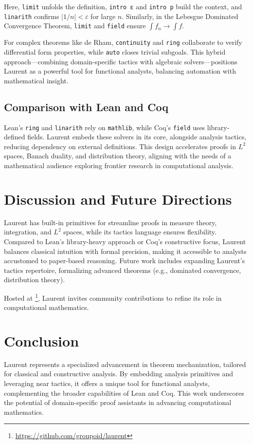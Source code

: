 \documentclass[12pt,twoside,draft]{cmpart}
\begin{document}
Here, \texttt{limit} unfolds the definition, \texttt{intro ε} and \texttt{intro p}
build the context, and \texttt{linarith} confirms $|1/n| < \varepsilon$ for
large $n$. Similarly, in the Lebesgue Dominated Convergence Theorem,
\texttt{limit} and \texttt{field} ensure $\int f_n \to \int f$.

For complex theorems like de Rham, \texttt{continuity} and \texttt{ring}
collaborate to verify differential form properties, while \texttt{auto}
closes trivial subgoals. This hybrid approach—combining domain-specific
tactics with algebraic solvers—positions Laurent as a powerful tool for
functional analysts, balancing automation with mathematical insight.

\subsection{Comparison with Lean and Coq}
Lean’s \texttt{ring} and \texttt{linarith} rely on \texttt{mathlib},
while Coq’s \texttt{field} uses library-defined fields. Laurent embeds
these solvers in its core, alongside analysis tactics, reducing dependency
on external definitions. This design accelerates proofs in $L^2$ spaces,
Banach duality, and distribution theory, aligning with the needs of a
mathematical audience exploring frontier research in computational analysis.

\section{Discussion and Future Directions}
Laurent has built-in primitives for streamline proofs in measure theory, integration, and $L^2$ spaces,
while its tactics language ensures flexibility. Compared to Lean’s library-heavy approach
or Coq’s constructive focus, Laurent balances classical intuition with formal precision,
making it accessible to analysts accustomed to paper-based reasoning. Future work includes
expanding Laurent’s tactics repertoire, formalizing advanced
theorems (e.g., dominated convergence, distribution theory).

Hosted at \footnote{\url{https://github.com/groupoid/laurent}}, Laurent invites community
contributions to refine its role in computational mathematics.

\section{Conclusion}
Laurent represents a specialized advancement in theorem mechanization, tailored for classical and constructive analysis.
By embedding analysis primitives and leveraging near tactics, it offers a unique tool for functional analysts,
complementing the broader capabilities of Lean and Coq. This work underscores the potential of domain-specific
proof assistants in advancing computational mathematics.
\end{document}
